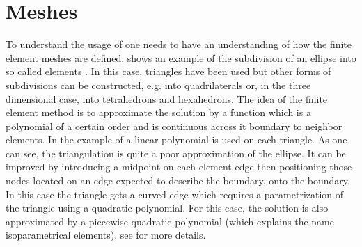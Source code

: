 \section{Meshes}
To understand the usage of \finley one needs to have an understanding of how the finite element meshes
 are defined.  shows an example of the
subdivision of an ellipse into so called elements  . 
In this case, triangles have been used but other forms of subdivisions
can be constructed, e.g. into quadrilaterals or, in the three dimensional case, into tetrahedrons
and hexahedrons. The idea of the finite element method is to approximate the solution by a function
which is a polynomial of a certain order and is continuous across it boundary to neighbor elements.
In the example of  a linear polynomial is used on each triangle. As one can see, the triangulation
is quite a poor approximation of the ellipse. It can be improved by introducing a midpoint on each element edge then
positioning those nodes located on an edge expected to describe the boundary, onto the boundary.
In this case the triangle gets a curved edge which requires a parametrization of the triangle using a 
quadratic polynomial. For this case, the solution is also approximated by a piecewise quadratic polynomial
(which explains the name isoparametrical elements), see  for more details.   

